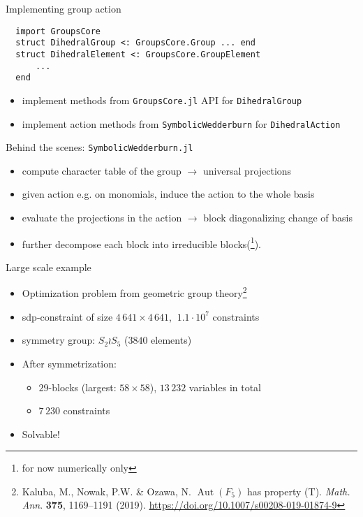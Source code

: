 \begin{frame}[fragile]{Implementing group action}
\footnotesize

  \begin{verbatim}
  import GroupsCore
  struct DihedralGroup <: GroupsCore.Group ... end
  struct DihedralElement <: GroupsCore.GroupElement
      ...
  end
  \end{verbatim}
\normalsize
  \begin{itemize}
    \item implement methods from \texttt{GroupsCore.jl} API for \texttt{DihedralGroup}
    \item implement action methods from \texttt{SymbolicWedderburn} for \texttt{DihedralAction}
  \end{itemize}
\end{frame}

\begin{frame}{Behind the scenes: \texttt{SymbolicWedderburn.jl}}
    \begin{itemize}
      \item compute \alert{character table} of the group $\longrightarrow$ universal projections
      \item given action e.g. on monomials, \alert{induce} the action to the whole basis
      \item evaluate the projections in the action $\longrightarrow$ \alert{block diagonalizing} change of basis
      \item further \alert{decompose} each block into \alert{irreducible} blocks(\footnote{for now numerically only}).
    \end{itemize}
\end{frame}


\begin{frame}{Large scale example}

  \begin{itemize}
    \item Optimization problem from geometric group theory\footnote{Kaluba, M., Nowak, P.W. \& Ozawa, N. $\operatorname{Aut}(F_5)$ has property (T). \textit{Math. Ann}. \textbf{375}, 1169–1191 (2019). \url{https://doi.org/10.1007/s00208-019-01874-9}}
    \item sdp-constraint of size $4\,641\times 4\,641$, $~1.1\cdot 10^7$ constraints
    \item symmetry group: $S_2 \wr S_5$ ($3840$ elements)
    \item After symmetrization:
      \begin{itemize}
        \item $29$-blocks (largest: $58\times 58$), $13\,232$ variables in total
        \item $7\,230$ constraints
      \end{itemize}
    \item Solvable!
  \end{itemize}

\end{frame}

